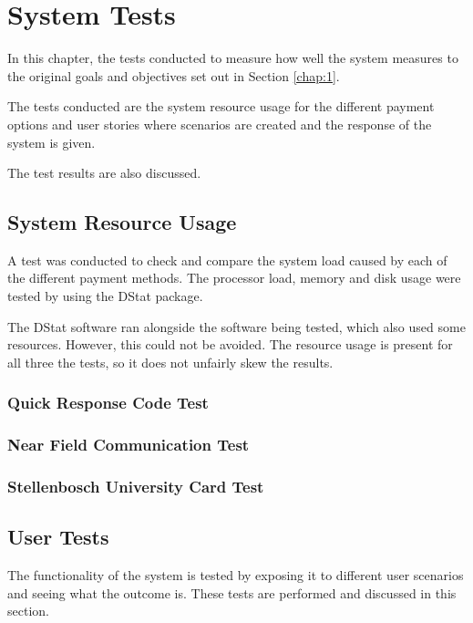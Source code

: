 \chapter{System Tests}
\label{chap:6}

In this chapter, the tests  conducted to measure how well the system measures to the
original goals and objectives set out in Section \ref{chap:1}. 

The tests conducted are the system resource usage for the different payment
options and user stories where scenarios are created and the response of the
system is given.

The test results are also discussed. 

\section{System Resource Usage}

A test was conducted to check and compare the system load caused by each of the
different payment methods. The processor load, memory and disk usage were tested
by using the DStat package.

The DStat software ran alongside the software being tested, which also used some
resources. However, this could not be avoided. The resource usage is
present for all three the tests, so it does not unfairly skew the results.

\subsection{Quick Response Code Test}

\subsection{Near Field Communication Test}

\subsection{Stellenbosch University Card Test}

\section{User Tests}

The functionality of the system is tested by exposing it to different user scenarios and
seeing what the outcome is. These tests are performed and discussed in this section.


